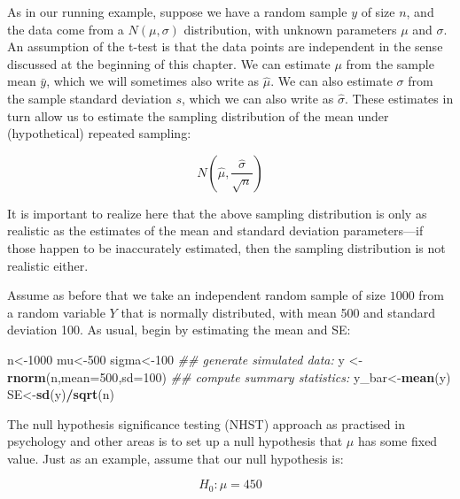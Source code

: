 \documentclass[12pt,]{krantz}
\newenvironment{Shaded}{\begin{snugshade}}{\end{snugshade}}
\newcommand{\CommentTok}[1]{\textcolor[rgb]{0.56,0.35,0.01}{\textit{#1}}}
\newcommand{\DataTypeTok}[1]{\textcolor[rgb]{0.13,0.29,0.53}{#1}}
\newcommand{\DecValTok}[1]{\textcolor[rgb]{0.00,0.00,0.81}{#1}}
\newcommand{\KeywordTok}[1]{\textcolor[rgb]{0.13,0.29,0.53}{\textbf{#1}}}
\newcommand{\NormalTok}[1]{#1}
\newcommand{\OperatorTok}[1]{\textcolor[rgb]{0.81,0.36,0.00}{\textbf{#1}}}
\newcommand{\StringTok}[1]{\textcolor[rgb]{0.31,0.60,0.02}{#1}}
\begin{document}
As in our running example, suppose we have a random sample \(y\) of size \(n\), and the data come from a \(N(\mu,\sigma)\) distribution, with unknown parameters \(\mu\) and \(\sigma\). An assumption of the t-test is that the data points are independent in the sense discussed at the beginning of this chapter.
We can estimate \(\mu\) from the sample mean \(\bar{y}\), which we will sometimes also write as \(\hat \mu\). We can also estimate \(\sigma\) from the sample standard deviation \(s\), which we can also write as \(\hat\sigma\). These estimates in turn allow us to estimate the sampling distribution of the mean under (hypothetical) repeated sampling:

\begin{equation}
N(\hat\mu,\frac{\hat \sigma}{\sqrt{n}})
\end{equation}

It is important to realize here that the above sampling distribution is only as realistic as the estimates of the mean and standard deviation parameters---if those happen to be inaccurately estimated, then the sampling distribution is not realistic either.

Assume as before that we take an independent random sample of size \(1000\) from a random variable \(Y\) that is normally distributed, with mean 500 and standard deviation 100. As usual, begin by estimating the mean and SE:

\begin{Shaded}
\begin{Highlighting}[]
\NormalTok{n<-}\DecValTok{1000}
\NormalTok{mu<-}\DecValTok{500}
\NormalTok{sigma<-}\DecValTok{100}
\CommentTok{## generate simulated data:}
\NormalTok{y <-}\StringTok{ }\KeywordTok{rnorm}\NormalTok{(n,}\DataTypeTok{mean=}\DecValTok{500}\NormalTok{,}\DataTypeTok{sd=}\DecValTok{100}\NormalTok{)}
\CommentTok{## compute summary statistics:}
\NormalTok{y_bar<-}\KeywordTok{mean}\NormalTok{(y)}
\NormalTok{SE<-}\KeywordTok{sd}\NormalTok{(y)}\OperatorTok{/}\KeywordTok{sqrt}\NormalTok{(n)}
\end{Highlighting}
\end{Shaded}

The null hypothesis significance testing (NHST) approach as practised in psychology and other areas is to set up a null hypothesis that \(\mu\) has some fixed value. Just as an example, assume that our null hypothesis is:

\begin{equation}
H_0: \mu = 450
\end{equation}
\end{document}
